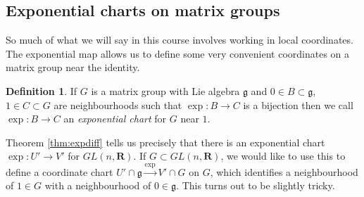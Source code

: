 \documentclass[12pt]{article}
\newcommand{\RR}{\mathbf{R}}
\theoremstyle{definition}
\newtheorem{dfn}[thm]{Definition}
\theoremstyle{check}
\theoremstyle{remark}
\theoremstyle{TheoremNum}
\begin{document}
\subsection{Exponential charts on matrix groups}

So much of what we will say in this course involves working in local coordinates. The exponential map allows us to define some very convenient coordinates on a matrix group near the identity.

\begin{dfn}
If $G$ is a matrix group with Lie algebra $\mathfrak{g}$ and $0\in B\subset\mathfrak{g}$, $1\in C\subset G$ are neighbourhoods such that $\exp\colon B\to C$ is a bijection then we call $\exp\colon B\to C$ an {\em exponential chart} for $G$ near $1$.
\end{dfn}

Theorem \ref{thm:expdiff} tells us precisely that there is an exponential chart $\exp\colon U'\to V'$ for $GL(n,\RR)$. If $G\subset GL(n,\RR)$, we would like to use this to define a coordinate chart $U'\cap\mathfrak{g}\stackrel{\exp}{\to} V'\cap G$ on $G$, which identifies a neighbourhood of $1\in G$ with a neighbourhood of $0\in\mathfrak{g}$. This turns out to be slightly tricky.
\end{document}
